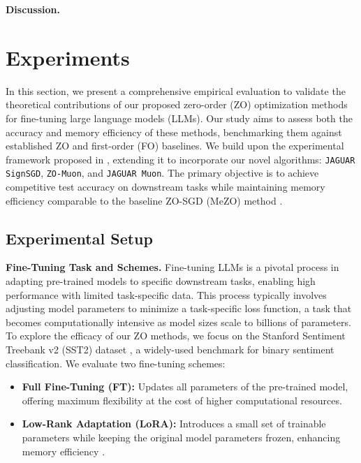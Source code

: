 \documentclass{article}
\theoremstyle{plain}
\theoremstyle{definition}
\theoremstyle{remark}
\begin{document}
\textbf{Discussion.} 





\section{Experiments} \label{sec:exp}

In this section, we present a comprehensive empirical evaluation to validate the theoretical contributions of our proposed zero-order (ZO) optimization methods for fine-tuning large language models (LLMs). Our study aims to assess both the accuracy and memory efficiency of these methods, benchmarking them against established ZO and first-order (FO) baselines. We build upon the experimental framework proposed in \cite{zo_bench}, extending it to incorporate our novel algorithms: \texttt{JAGUAR SignSGD}, \texttt{ZO-Muon}, and \texttt{JAGUAR Muon}. The primary objective is to achieve competitive test accuracy on downstream tasks while maintaining memory efficiency comparable to the baseline ZO-SGD (MeZO) method \cite{malladi2023fine}.

\subsection{Experimental Setup}

\textbf{Fine-Tuning Task and Schemes.} Fine-tuning LLMs is a pivotal process in adapting pre-trained models to specific downstream tasks, enabling high performance with limited task-specific data. This process typically involves adjusting model parameters to minimize a task-specific loss function, a task that becomes computationally intensive as model sizes scale to billions of parameters. To explore the efficacy of our ZO methods, we focus on the Stanford Sentiment Treebank v2 (SST2) dataset \cite{socher2013recursive}, a widely-used benchmark for binary sentiment classification. We evaluate two fine-tuning schemes:
\begin{itemize}
    \item \textbf{Full Fine-Tuning (FT):} Updates all parameters of the pre-trained model, offering maximum flexibility at the cost of higher computational resources.
    \item \textbf{Low-Rank Adaptation (LoRA):} Introduces a small set of trainable parameters while keeping the original model parameters frozen, enhancing memory efficiency \cite{hu2021lora}.
\end{itemize}
\end{document}
